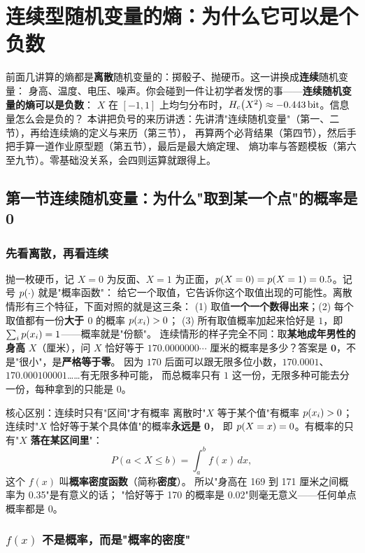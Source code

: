 \section{连续型随机变量的熵：为什么它可以是个负数}

前面几讲算的熵都是\textbf{离散}随机变量的：掷骰子、抛硬币。这一讲换成\textbf{连续}随机变量：
身高、温度、电压、噪声。你会碰到一件让初学者发愣的事——\textbf{连续随机变量的熵可以是负数}：
$X$ 在 $[-1,1]$ 上均匀分布时，$H_{c}\!\left(X^2\right)\approx-0.443\,\text{bit}$。信息量怎么会是负的？
本讲把负号的来历讲透：先讲清"连续随机变量"（第一、二节），再给连续熵的定义与来历（第三节），
再算两个必背结果（第四节），然后手把手算一道作业原型题（第五节），最后是最大熵定理、
熵功率与答题模板（第六至九节）。零基础没关系，会四则运算就跟得上。

\subsection{第一节\quad 连续随机变量：为什么"取到某一个点"的概率是 0}

\subsubsection{先看离散，再看连续}

抛一枚硬币，记 $X=0$ 为反面、$X=1$ 为正面，$p\!\left(X=0\right)=p\!\left(X=1\right)=0.5$。记号 $p\!\left(\cdot\right)$ 就是"概率函数"：
给它一个取值，它告诉你这个取值出现的可能性。离散情形有三个特征，下面对照的就是这三条：
(1) 取值\textbf{一个一个数得出来}；(2) 每个取值都有一份\textbf{大于 $0$} 的概率 $p\!\left(x_i\right)>0$；
(3) 所有取值概率加起来恰好是 $1$，即 $\sum_ip\!\left(x_i\right)=1$——概率就是"份额"。
连续情形的样子完全不同：取\textbf{某地成年男性的身高} $X$（厘米），问 $X$ 恰好等于
$170.0000000\cdots$ 厘米的概率是多少？答案是 $\mathbf{0}$，不是"很小"，是\textbf{严格等于零}。
因为 $170$ 后面可以跟无限多位小数，$170.0001$、$170.000100001$……有无限多种可能，
而总概率只有 $1$ 这一份，无限多种可能去分一份，每种拿到的只能是 $0$。

\begin{defbox}{核心区别：连续时只有"区间"才有概率}
离散时"$X$ 等于某个值"有概率 $p\!\left(x_i\right)>0$；连续时"$X$ 恰好等于某个具体值"的概率\textbf{永远是 0}，
即 $p\!\left(X=x\right)=0$。有概率的只有"$X$ \textbf{落在某区间里}"：
\[
P(a<X\le b)=\int_a^b f(x)\,dx ,
\]
这个 $f(x)$ 叫\textbf{概率密度函数}（简称\textbf{密度}）。
所以"身高在 169 到 171 厘米之间概率为 0.35"是有意义的话；
"恰好等于 170 的概率是 0.02"则毫无意义——任何单点概率都是 $0$。
\end{defbox}

\subsubsection{$f(x)$ 不是概率，而是"概率的密度"}

